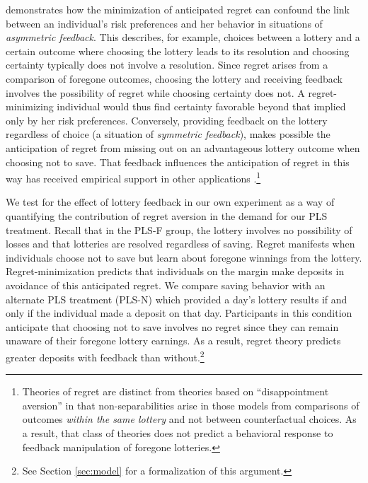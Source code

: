 \documentclass[12pt, titlepage]{article}
\begin{document}
		\textcite{zeelenberg_consequences_1996} demonstrates how the minimization of anticipated regret can confound the link between an individual's risk preferences and her behavior in situations of \emph{asymmetric feedback}. This describes, for example, choices between a lottery and a certain outcome where choosing the lottery leads to its resolution and choosing certainty typically does not involve a resolution. Since regret arises from a comparison of foregone outcomes, choosing the lottery and receiving feedback involves the possibility of regret while choosing certainty does not. A regret-minimizing individual would thus find certainty favorable beyond that implied only by her risk preferences. Conversely, providing feedback on the lottery regardless of choice (a situation of \emph{symmetric feedback}), makes possible the anticipation of regret from missing out on an advantageous lottery outcome when choosing not to save. That feedback influences the anticipation of regret in this way has received empirical support in other applications \parencite{somasundaram_regret_2017,filiz-ozbay_auctions_2007,zeelenberg_consequences_2004}.\footnote{Theories of regret are distinct from theories based on ``disappointment aversion'' \parencite{gul_theory_1991} in that non-separabilities arise in those models from comparisons of outcomes \emph{within the same lottery} and not between counterfactual choices. As a result, that class of theories does not predict a behavioral response to feedback manipulation of foregone lotteries.}

		We test for the effect of lottery feedback in our own experiment as a way of quantifying the contribution of regret aversion in the demand for our PLS treatment. Recall that in the PLS-F group, the lottery involves no possibility of losses and that lotteries are resolved regardless of saving. Regret manifests when individuals choose not to save but learn about foregone winnings from the lottery. Regret-minimization predicts that individuals on the margin make deposits in avoidance of this anticipated regret. We compare saving behavior with an alternate PLS treatment (PLS-N) which provided a day's lottery results if and only if the individual made a deposit on that day. Participants in this condition anticipate that choosing not to save involves no regret since they can remain unaware of their foregone lottery earnings. As a result, regret theory predicts greater deposits with feedback than without.\footnote{See Section \ref{sec:model} for a formalization of this argument.}
\end{document}
